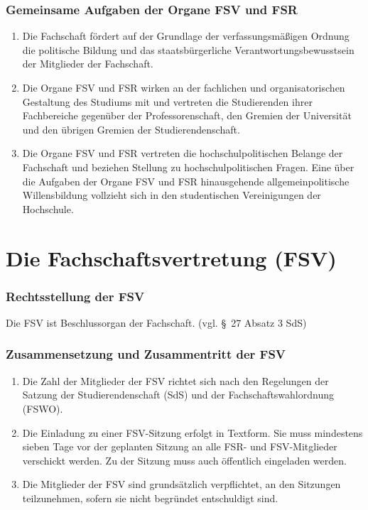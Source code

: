 \documentclass{article}
\begin{document}
\section{Gemeinsame Aufgaben der Organe FSV und FSR}
\begin{enumerate}[(1)]
\item Die Fachschaft fördert auf der Grundlage der verfassungsmäßigen Ordnung die politische Bildung und das staatsbürgerliche Verantwortungsbewusstsein der Mitglieder der Fachschaft.
\item Die Organe FSV und FSR wirken an der fachlichen und organisatorischen Gestaltung des Studiums mit und vertreten die Studierenden ihrer Fachbereiche gegenüber der Professorenschaft, den Gremien der Universität und den übrigen Gremien der Studierendenschaft.
\item Die Organe FSV und FSR vertreten die hochschulpolitischen Belange der Fachschaft und beziehen Stellung zu hochschulpolitischen Fragen. Eine über die Aufgaben der Organe FSV und FSR hinausgehende allgemeinpolitische Willensbildung vollzieht sich in den studentischen Vereinigungen der Hochschule.
\end{enumerate}

\part{Die Fachschaftsvertretung (FSV)}
\section{Rechtsstellung der FSV}
Die FSV ist Beschlussorgan der Fachschaft. (vgl. §~27 Absatz 3 SdS)

\section{Zusammensetzung und Zusammentritt der FSV}
\begin{enumerate}[(1)]
\item Die Zahl der Mitglieder der FSV richtet sich nach den Regelungen der Satzung der Studierendenschaft (SdS) und der Fachschaftswahlordnung (FSWO).
\item Die Einladung zu einer FSV-Sitzung erfolgt in Textform. Sie muss mindestens sieben Tage vor der geplanten Sitzung an alle FSR- und FSV-Mitglieder verschickt werden. Zu der Sitzung muss auch öffentlich eingeladen werden.
\item Die Mitglieder der FSV sind grundsätzlich verpflichtet, an den Sitzungen teilzunehmen, sofern sie nicht begründet entschuldigt sind.
\end{enumerate}
\end{document}
